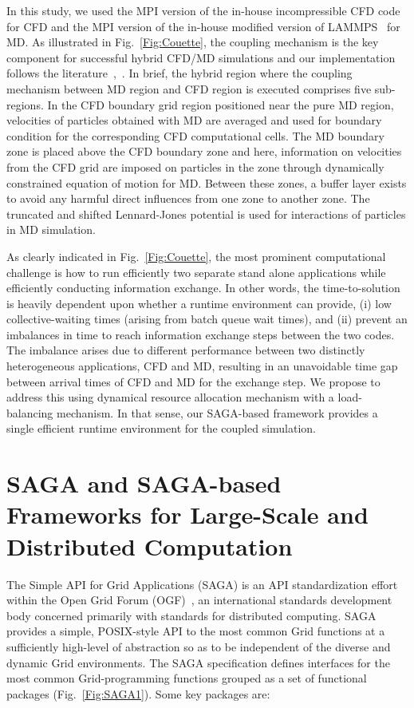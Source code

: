 \documentclass[conference,final]{IEEEtran}
\newcommand{\Nkimnote}[1]{ {\textcolor{green} { ***Nkim: #1 }}}
\newcommand{\Nkimnote}[1]{}
\begin{document}
In this study, we used the MPI version of the in-house incompressible CFD code~\cite{Lee} for CFD and the MPI version of the in-house modified version of LAMMPS~\cite{LAMMPS} for MD.  As illustrated in Fig.~\ref{Fig:Couette}, the coupling mechanism is the key component for successful hybrid CFD/MD simulations and our implementation follows the literature~\cite{Nie},~\cite{Yen}. In brief, the hybrid region where the coupling mechanism between MD region and CFD region is executed comprises five sub-regions.  In the CFD boundary grid region positioned near the pure MD region, velocities of particles obtained with MD are averaged and used for boundary condition for the corresponding CFD computational cells.  The MD boundary zone is placed above the CFD boundary zone and here, information on velocities from the CFD grid are imposed on particles in the zone through dynamically constrained equation of motion for MD.  Between these zones, a buffer layer exists to avoid any harmful direct influences from one zone to another zone.  The truncated and shifted Lennard-Jones potential is used for interactions of particles in MD simulation.

As clearly indicated in Fig.~\ref{Fig:Couette}, the most prominent computational challenge is how to run efficiently two separate stand alone applications while efficiently conducting information exchange.  In other words, the time-to-solution is heavily dependent upon whether a runtime environment can provide, (i) low collective-waiting times (arising from batch queue wait times), and (ii) prevent an imbalances in time to reach information exchange steps between the two codes.  The imbalance arises due to different performance between two distinctly heterogeneous applications, CFD and MD, resulting in an unavoidable time gap between arrival times of CFD and MD for the exchange step.  We propose to address this using dynamical resource allocation mechanism with a load-balancing mechanism.  In that sense, our SAGA-based framework provides a single efficient runtime environment for the coupled simulation.



\section{SAGA and SAGA-based Frameworks for Large-Scale and Distributed Computation}

The Simple API for Grid Applications (SAGA) is an API standardization effort within the Open Grid Forum (OGF)~\cite{ogf_web}, an international standards development body concerned primarily with standards for distributed computing.  SAGA provides a simple, POSIX-style API to the most common Grid functions at a sufficiently high-level of abstraction so as to be %
independent of the diverse and dynamic Grid environments. The SAGA specification defines interfaces for the most common Grid-programming functions grouped as a set of functional packages (Fig.~\ref{Fig:SAGA1}). Some key packages are:
\end{document}
